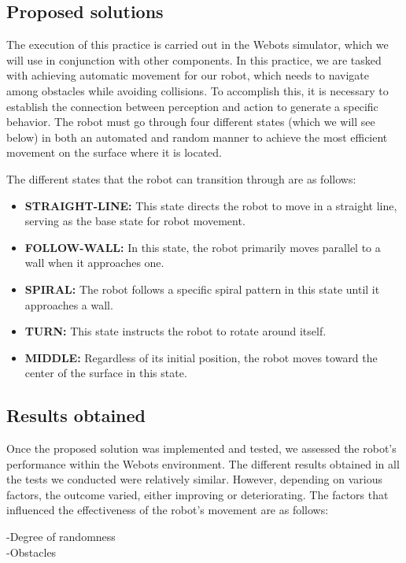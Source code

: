 \documentclass[conference]{IEEEtran}
\begin{document}
\subsection{Proposed solutions}
The execution of this practice is carried out in the Webots simulator, which we will use in conjunction with other components. In this practice, we are tasked with achieving automatic movement for our robot, which needs to navigate among obstacles while avoiding collisions. To accomplish this, it is necessary to establish the connection between perception and action to generate a specific behavior. The robot must go through four different states (which we will see below) in both an automated and random manner to achieve the most efficient movement on the surface where it is located.

The different states that the robot can transition through are as follows:

\begin{itemize}
    \item \textbf{STRAIGHT-LINE:} This state directs the robot to move in a straight line, serving as the base state for robot movement.
    \item \textbf{FOLLOW-WALL:} In this state, the robot primarily moves parallel to a wall when it approaches one.
    \item \textbf{SPIRAL:} The robot follows a specific spiral pattern in this state until it approaches a wall.
    \item \textbf{TURN:} This state instructs the robot to rotate around itself.
    \item \textbf{MIDDLE:} Regardless of its initial position, the robot moves toward the center of the surface in this state.
\end{itemize}
     

\subsection{Results obtained}
Once the proposed solution was implemented and tested, we assessed the robot's performance within the Webots environment. The different results obtained in all the tests we conducted were relatively similar. However, depending on various factors, the outcome varied, either improving or deteriorating. The factors that influenced the effectiveness of the robot's movement are as follows:

\begin{description}
    \item[-Degree of randomness]
    \item[-Obstacles]
\end{description}   
\vspace{1.0 cm}
\end{document}
